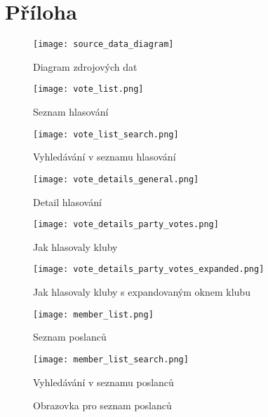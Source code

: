 \chapter{Příloha}

\begin{figure}[H]
	\texttt{[image: source\_data\_diagram]}
	\caption{Diagram zdrojových dat}
	\label{fig:class-diagram}
\end{figure}

\begin{figure}[H]
	\begin{minipage}{0.5\textwidth}
		\centering
		\texttt{[image: vote\_list.png]}
		\caption{Seznam hlasování}
		\label{fig:vote_list}
	\end{minipage}%
	\begin{minipage}{0.5\textwidth}
		\centering
		\texttt{[image: vote\_list\_search.png]}
		\caption{Vyhledávání v seznamu hlasování}
		\label{fig:vote_list_search}
	\end{minipage}
\end{figure}

\begin{figure}[H]
	\begin{minipage}{0.5\textwidth}
		\centering
		\texttt{[image: vote\_details\_general.png]}
		\caption{Detail hlasování}
		\label{fig:vote_details_general}
	\end{minipage}%
	\begin{minipage}{0.5\textwidth}
		\centering
		\texttt{[image: vote\_details\_party\_votes.png]}
		\caption{Jak hlasovaly kluby}
		\label{fig:vote_details_party_votes}
	\end{minipage}
	\begin{minipage}{0.5\textwidth}
	\centering
	\texttt{[image: vote\_details\_party\_votes\_expanded.png]}
	\caption{Jak hlasovaly kluby s expandovaným oknem klubu}
	\label{fig:vote_details_party_votes_expanded}
\end{minipage}
\end{figure}

\begin{figure}[H]
	\begin{minipage}{0.5\textwidth}
		\centering
		\texttt{[image: member\_list.png]}
		\caption{Seznam poslanců}
		\label{fig:member_list}
	\end{minipage}%
	\begin{minipage}{0.5\textwidth}
		\centering
		\texttt{[image: member\_list\_search.png]}
		\caption{Vyhledávání v seznamu poslanců}
		\label{fig:member_list_search}
	\end{minipage}
	\caption{Obrazovka pro seznam poslanců}
\end{figure}

